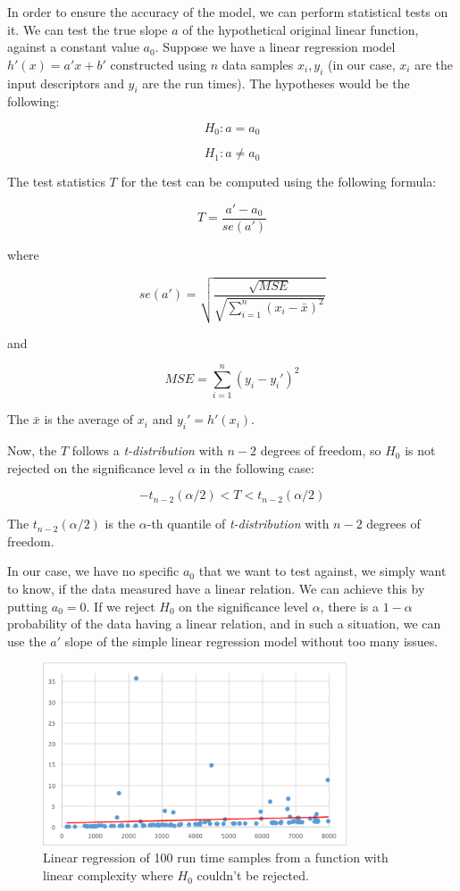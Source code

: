 In order to ensure the accuracy of the model, we can perform statistical tests on it. We can test the true slope \(a\) of the hypothetical original linear function, against a constant value \(a_0\). Suppose we have a linear regression model \(h'(x) = a' x + b'\) constructed using \(n\) data samples \(x_i, y_i\) (in our case, \(x_i\) are the input descriptors and \(y_i\) are the run times). The hypotheses would be the following:

\[H_0: a = a_0 \]

\[H_1: a \neq a_0 \]

The test statistics \(T\) for the test can be computed using the following formula:

\[T = \frac{a' - a_0}{se(a')}\]

where

\[se(a') = \sqrt{\frac{\sqrt{MSE}}{ \sqrt{ \sum_{i = 1}^{n} (x_i - \bar{x})^2 }}} \]

and

\[MSE = { \sum_{i = 1}^{n} (y_i - y_i')^2 }\]

The \(\bar{x}\) is the average of \(x_i\) and \(y_i' = h'(x_i)\).

Now, the \(T\) follows a \textit{t-distribution} with \(n-2\) degrees of freedom, so \(H_0\) is not rejected on the significance level $\alpha$ in the following case:

\[- t_{n - 2}(\alpha / 2) < T < t_{n - 2}(\alpha / 2)\]

The $t_{n - 2}(\alpha / 2)$ is the $\alpha$-th quantile of \textit{t-distribution} with $n-2$ degrees of freedom.

In our case, we have no specific $a_0$ that we want to test against, we simply want to know, if the data measured have a linear relation. We can achieve this by putting $a_0 = 0$. If we reject $H_0$ on the significance level $\alpha$, there is a $1 - \alpha$ probability of the data having a linear relation, and in such a situation, we can use the $a'$ slope of the simple linear regression model without too many issues.

\begin{figure}[h!]
	\centerline{\mbox{\includegraphics[width=90mm]{./img/linear_cantreject.png}}}
	\caption{Linear regression of 100 run time samples from a function with linear complexity where $H_0$ couldn't be rejected.}
	\label{fig:linear_cantreject}
\end{figure}

